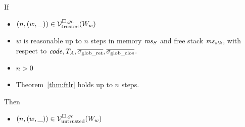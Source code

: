 \documentclass[a4paper]{article}
\begin{document}
\begin{lemma}
  \label{lem:trusted-and-reasonable-is-untrusted}
  If
  \begin{itemize}
  \item $\left(n,(w,\_)\right) \in \mathcal{V}^{\square,\mathit{gc}}_{\mathrm{trusted}}(W_w)$
  \item $w$ is reasonable up to $n$ steps in memory $\mathit{ms}_S$ and free stack $\mathit{ms}_{\mathit{stk}}$, with respect to $\mathit{code},T_{A},\overline{\sigma_{\mathrm{glob\_ret}}},\overline{\sigma_{\mathrm{glob\_clos}}}$.
  \item $n > 0$
  \item Theorem~\ref{thm:ftlr} holds up to $n$ steps.
  \end{itemize}
  Then
  \begin{itemize}
  \item $\left(n,(w,\_)\right) \in \mathcal{V}^{\square,\mathit{gc}}_{\mathrm{untrusted}}(W_w)$
  \end{itemize}
\end{lemma}
\end{document}
